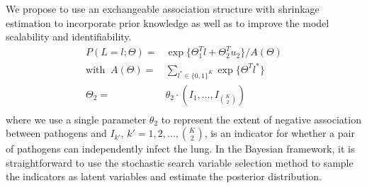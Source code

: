 \documentclass[11 pt, a4paper]{article}  %
\begin{document}
We propose to use an exchangeable association structure with shrinkage estimation to incorporate prior knowledge as well as to improve the model scalability and identifiability. 
\begin{align}
P(L=l; \Theta) = & \exp \{\Theta_1^T l + \Theta_2^{T} u_2 \}/ A(\Theta) \\ 
\text{with }\                                                   \nonumber
A(\Theta) = & \sum_{l^* \in \{0,1\}^K}\exp \{ \Theta^T l^*\} \\ \nonumber
\Theta_2 = & \theta_2 \cdot (I_1, \ldots, I_{{K \choose 2}}) \\ \nonumber
\end{align}
where we use a single parameter $\theta_2$ to represent the extent of negative association between pathogens and $I_{k'}$, $k' = 1, 2, \ldots, {K \choose 2}$, is an indicator for whether a pair of pathogens can independently infect the lung. In the Bayesian framework, it is straightforward to use the stochastic search variable selection \cite{george1993variable, george1996stochastic} method to sample the indicators as latent variables and estimate the posterior distribution.\\
\end{document}
